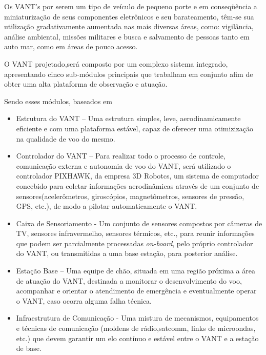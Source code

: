 Os VANT's por serem um tipo de veículo de pequeno porte e em conseqüência a miniaturização de seus componentes eletrônicos e seu barateamento, têm-se sua utilização gradativamente aumentada nas mais diversas áreas, como: vigilância, análise ambiental, missões militares e busca e salvamento de pessoas tanto em auto mar, como em áreas de pouco acesso. \cite{Branco}

O VANT projetado,será composto por um complexo sistema integrado, apresentando cinco sub-módulos principais  que trabalham em conjunto afim de obter uma alta plataforma de observação e atuação.

Sendo esses módulos, baseados em \cite{pastor}

\begin{itemize}
	\item Estrutura do VANT – Uma estrutura simples, leve, aerodinamicamente eficiente e com uma plataforma estável, capaz de oferecer uma otimizização na qualidade de voo do mesmo. 
	\item Controlador do VANT – Para realizar todo o processo de controle, comunicação externa e autonomia de voo do VANT, será utilizado o controlador PIXHAWK, da empresa 3D Robotcs, um sistema de computador concebido para coletar informações aerodinâmicas através de um conjunto de sensores(acelerômetros, giroscópios, magnetômetros, sensores de pressão, GPS, etc.), de modo a pilotar automaticamente o VANT.
	\item Caixa de Sensoriamento - Um conjunto de sensores compostos por câmeras de TV, sensores infravermelho, sensores térmicos, etc., para reunir informações que podem ser parcialmente processadas \textit{on-board}, pelo próprio controlador do VANT, ou transmitidas a uma base estação, para posterior análise.
	\item Estação Base – Uma equipe de chão, situada em uma região próxima a área de atuação do VANT, destinada a monitorar o desenvolvimento do voo, acompanhar e orientar o atendimento de emergência e eventualmente operar o VANT, caso ocorra alguma falha técnica. 
	\item Infraestrutura de Comunicação - Uma mistura de mecanismos, equipamentos e técnicas de comunicação (moldens de rádio,satcomm, links de microondas, etc.) que devem garantir um elo contínuo e estável entre o VANT e a estação de base. 
\end{itemize}


